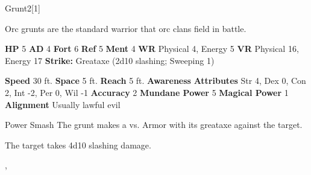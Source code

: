       
  \begin{monsubsection}{Grunt}{2}[1]
    \vspace{-1em}\vspace{-1em}
    \vspace{0em}

    
        Orc grunts are the standard warrior that orc clans field in battle.
      
    

    \begin{spellcontent}
      \begin{spelltargetinginfo}
        \pari \textbf{HP} 5 \monsep
          \textbf{AD} 4 \monsep
          \textbf{Fort} 6 \monsep
          \textbf{Ref} 5 \monsep
          \textbf{Ment} 4
        \pari \textbf{WR} Physical 4, Energy 5 \monsep
        \textbf{VR} Physical 16, Energy 17
        \pari \textbf{Strike:}
            Greataxe  (2d10 slashing; Sweeping 1)
      \end{spelltargetinginfo}
    \end{spellcontent}
    \begin{monsterfooter}
      \pari \textbf{Speed} 30 ft. \monsep
        \textbf{Space} 5 ft. \monsep
        \textbf{Reach} 5 ft.
      \pari \textbf{Awareness} 
      \pari \textbf{Attributes}
        Str 4, Dex 0,
        Con 2, Int -2,
        Per 0, Wil -1
      \pari \textbf{Accuracy} 2 \monsep
        \textbf{Mundane Power} 5 \monsep
      \textbf{Magical Power} 1
      \pari \textbf{Alignment} Usually lawful evil
    \end{monsterfooter}
  \end{monsubsection}
  \begin{freeability}{Power Smash}
       The grunt makes a 
         vs. Armor
        with its greataxe against the target.
    
    \hit The target takes 4d10 slashing damage.
    \end{freeability}
  ,
